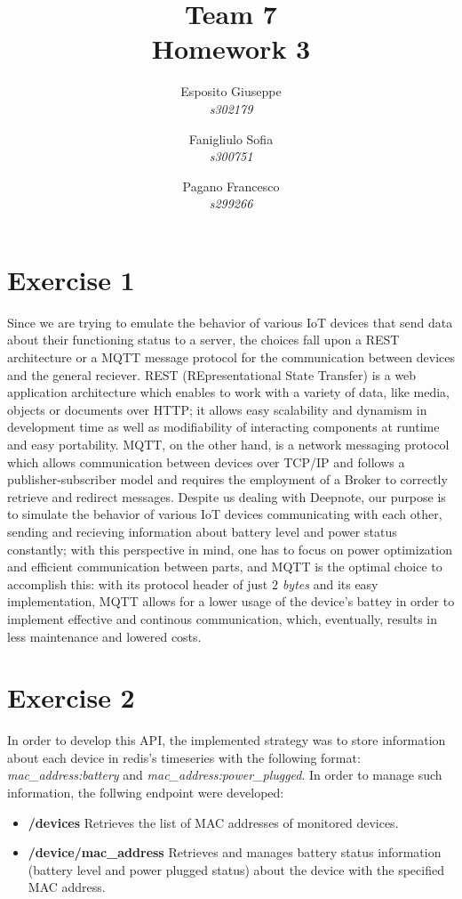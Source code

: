 \documentclass{article}
\title{\huge{Team 7 \\ Homework 3}}
\author{
Esposito Giuseppe\\
\textit{s302179}
\and
Fanigliulo Sofia\\
\textit{s300751}
\and
Pagano Francesco\\
\textit{s299266}}
\date{}
\begin{document}
\maketitle

\section{Exercise 1}

Since we are trying to emulate the behavior of various IoT devices that send data about their functioning status to a server, the choices fall upon a REST architecture or a MQTT message protocol for the communication between devices and the general reciever. REST (REpresentational State Transfer) is a web application architecture which enables to work with a variety of data, like media, objects or documents over HTTP; it allows easy scalability and dynamism in development time as well as modifiability of interacting components at runtime and easy portability. MQTT, on the other hand, is a network messaging protocol which allows communication between devices over TCP/IP and follows a publisher-subscriber model and requires the employment of a Broker to correctly retrieve and redirect messages. Despite us dealing with Deepnote, our purpose is to simulate the behavior of various IoT devices communicating with each other, sending and recieving information about battery level and power status constantly; with this perspective in mind, one has to focus on power optimization and efficient communication between parts, and MQTT is the optimal choice to accomplish this: with its protocol header of just \textit{$2$ bytes} and its easy implementation, MQTT allows for a lower usage of the device's battey in order to implement effective and continous communication, which, eventually, results in less maintenance and lowered costs.


\section{Exercise 2}



In order to develop this API, the implemented strategy was to store information about each device in redis's timeseries with the following format: \textit{{mac\_address}:battery} and \textit{{mac\_address}:power\_plugged}. In order to manage such information, the follwing endpoint were developed:
\begin{itemize}
	\item \textbf{/devices} Retrieves the list of MAC addresses of monitored devices.
	\item \textbf{/device/mac\_address} Retrieves and manages battery status information (battery level and power plugged status) about the device with the specified MAC address.
\end{itemize}
\end{document}
